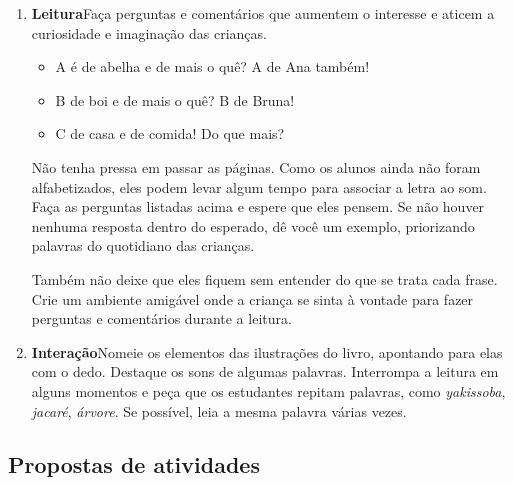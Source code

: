 \documentclass[11pt]{extarticle}
\begin{document}
\begin{enumerate}
\item \textbf{Leitura}\quad Faça perguntas e comentários que aumentem o 
interesse e aticem a curiosidade e imaginação das crianças. 

\begin{itemize}
\item A é de abelha e de mais o quê? A de Ana também!
\item B de boi e de mais o quê? B de Bruna!
\item C de casa e de comida! Do que mais?
\end{itemize}

Não tenha pressa em passar as páginas. Como os alunos ainda não foram 
alfabetizados, eles podem levar algum tempo para associar a letra
ao som. Faça as perguntas listadas acima e espere que eles 
pensem. Se não houver nenhuma resposta dentro do esperado,
dê você um exemplo, priorizando palavras do quotidiano das crianças.

Também não deixe que eles fiquem sem entender do que se trata cada frase. Crie 
um ambiente amigável onde a criança se sinta à vontade para fazer 
perguntas e comentários durante a leitura.


\item \textbf{Interação}\quad Nomeie os elementos das ilustrações 
do livro, apontando para elas com o dedo. Destaque os sons de algumas 
palavras. Interrompa a leitura em alguns momentos e peça que 
os estudantes repitam palavras, como \textit{yakissoba}, \textit{jacaré}, \textit{árvore}. Se possível, 
leia a mesma palavra várias vezes.
\end{enumerate}


\subsection{Propostas de atividades}

\end{document}
